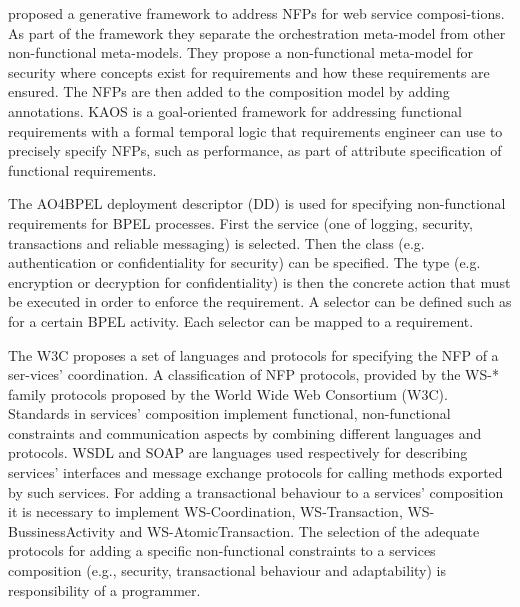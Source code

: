 \cite{ChLa09} proposed a generative framework to address NFPs for web service composi-tions. As part of the framework they separate the orchestration meta-model from other non-functional meta-models. They propose a non-functional meta-model for security where concepts exist for requirements and how these requirements are ensured. The NFPs are then added to the composition model by adding annotations.
KAOS \cite{DaLF93,Lams01} is a goal-oriented framework for addressing functional requirements with a formal temporal logic that requirements engineer can use to precisely specify NFPs, such as performance, as part of attribute specification of functional requirements. 

The AO4BPEL \cite{CSHM06} deployment descriptor (DD) is used for specifying non-functional requirements for BPEL processes. First the service (one of logging, security, transactions and reliable messaging) is selected. Then the class (e.g. authentication or confidentiality for security) can be specified. The type (e.g. encryption or decryption for confidentiality) is then the concrete action that must be executed in order to enforce the requirement.  A selector can be defined such as for a certain BPEL activity. Each selector can be mapped to a requirement. 

The W3C proposes a set of languages and protocols for specifying the NFP of a ser-vices’ coordination. A classification of NFP protocols, provided by the WS-* family protocols proposed by the World Wide Web Consortium (W3C). 
%
%
 Standards in services' composition implement functional, non-functional constraints and communication aspects by combining different languages and protocols. WSDL and SOAP are languages used respectively for describing services' interfaces and message exchange protocols for calling methods exported by such services. For adding a transactional behaviour to a services' composition it is necessary to implement WS-Coordination, WS-Transaction, WS-BussinessActivity and WS-AtomicTransaction. The selection of the adequate protocols for adding a specific non-functional constraints to a services composition (e.g., security, transactional behaviour and adaptability) is responsibility of a programmer. 
 



